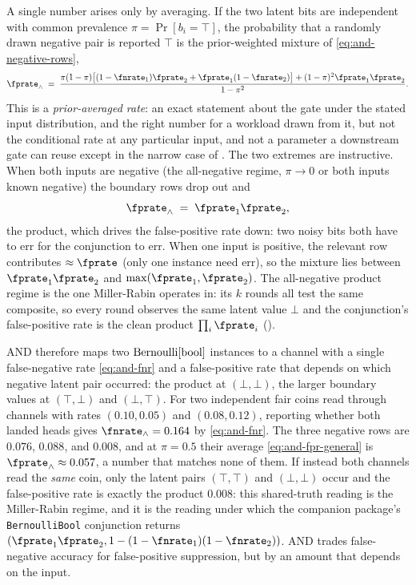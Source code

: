 A single number arises only by averaging. If the two latent bits are
independent with common prevalence $\pi = \Pr[b_i = \top]$,
the probability that a randomly drawn negative pair is reported $\top$ is the
prior-weighted mixture of \eqref{eq:and-negative-rows},
\begin{equation}
\label{eq:and-fpr-general}
  \fprate_\wedge
  \;=\;
  \frac{\pi(1 - \pi)\bigl[(1 - \fnrate_1)\fprate_2 + \fprate_1(1 - \fnrate_2)\bigr]
        + (1 - \pi)^2 \fprate_1 \fprate_2}
       {1 - \pi^2}.
\end{equation}
This is a \emph{prior-averaged rate}: an exact
statement about the gate under the stated input distribution, and the right
number for a workload drawn from it, but not the conditional rate at any
particular input, and not a parameter a downstream gate can reuse except in the
narrow case of . The two extremes are
instructive. When both inputs are negative (the all-negative regime, $\pi \to 0$
or both inputs known negative) the boundary rows drop out and
\[
  \fprate_\wedge \;=\; \fprate_1 \fprate_2,
\]
the product, which drives the false-positive rate down: two noisy bits both have
to err for the conjunction to err. When one input is positive, the relevant row
contributes $\approx \fprate$ (only one instance need err), so the mixture lies
between $\fprate_1 \fprate_2$ and $\max(\fprate_1, \fprate_2)$. The
all-negative product regime is the one Miller-Rabin operates in: its $k$ rounds
all test the same composite, so every round observes the same latent value
$\bot$ and the conjunction's false-positive rate is the clean product
$\prod_i \fprate_i$ ().

AND therefore maps two $\mathrm{Bernoulli}[\mathrm{bool}]$ instances to a
channel with a single false-negative rate \eqref{eq:and-fnr} and a
false-positive rate that depends on which negative latent pair occurred: the
product at $(\bot, \bot)$, the larger boundary values at $(\top, \bot)$ and
$(\bot, \top)$. For two independent fair coins read through channels with
rates $(0.10, 0.05)$ and $(0.08, 0.12)$, reporting whether both landed heads
gives $\fnrate_\wedge = 0.164$ by \eqref{eq:and-fnr}. The three negative rows
are $0.076$, $0.088$, and $0.008$, and at $\pi = 0.5$ their average
\eqref{eq:and-fpr-general} is $\fprate_\wedge \approx 0.057$, a number that
matches none of them. If instead both channels read the \emph{same} coin, only
the latent pairs $(\top, \top)$ and $(\bot, \bot)$ occur and the
false-positive rate is exactly the product $0.008$: this shared-truth reading is
the Miller-Rabin regime, and it is the reading under which the companion
package's \texttt{BernoulliBool} conjunction returns $(\fprate_1 \fprate_2,
1 - (1 - \fnrate_1)(1 - \fnrate_2))$. AND trades false-negative accuracy for
false-positive suppression, but by an amount that depends on the input.
